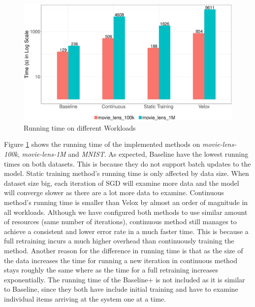 \documentclass{vldb}
\begin{document}
\begin{figure}[h]
\centering
\includegraphics[width=\columnwidth]{../images/experiment-results/times-log-scale-improved.eps}
 \caption{Running time on different Workloads}
 \label{fig:running-time}
 \end{figure}
Figure \ref{fig:running-time} shows the running time of the implemented methods on \textit{movie-lens-100k}, \textit{movie-lens-1M} and \textit{MNIST}.
As expected, Baseline have the lowest running times on both datasets.
This is because they do not support batch updates to the model.
Static training method's running time is only affected by data size.
When dataset size big, each iteration of SGD will examine more data and the model will converge slower as there are a lot more data to examine.
Continuous method's running time is smaller than Velox by almost an order of magnitude in all workloads.
Although we have configured both methods to use similar amount of resources (same number of iterations), continuous method still manages to achieve a consistent and lower error rate in a much faster time.
This is because a full retraining incurs a much higher overhead than continuously training the method.
Another reason for the difference in running time is that as the size of the data increases the time for running a new iteration in continuous method stays roughly the same where as the time for a full retraining increases exponentially.
The running time of the Baseline+ is not included as it is similar to Baseline, since they both have include initial training and have to examine individual items arriving at the system one at a time.
\end{document}
